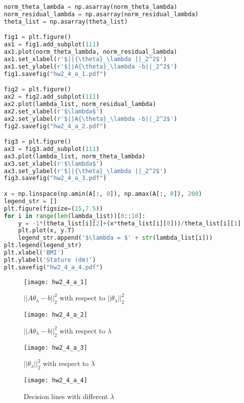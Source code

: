 \documentclass[11pt]{article}
\begin{document}
\begin{enumerate}[label=(\alph*)]
\begin{enumerate}[label=(\roman*)]
\begin{lstlisting}[language=Python, showstringspaces=false]
norm_theta_lambda = np.asarray(norm_theta_lambda)
norm_residual_lambda = np.asarray(norm_residual_lambda)
theta_list = np.asarray(theta_list)

fig1 = plt.figure()
ax1 = fig1.add_subplot(111)
ax1.plot(norm_theta_lambda, norm_residual_lambda)
ax1.set_xlabel(r'$||{\theta}_\lambda ||_2^2$')
ax1.set_ylabel(r'$||A{\theta}_\lambda -b||_2^2$')
fig1.savefig("hw2_4_a_1.pdf")

fig2 = plt.figure()
ax2 = fig2.add_subplot(111)
ax2.plot(lambda_list, norm_residual_lambda)
ax2.set_xlabel(r'$\lambda$')
ax2.set_ylabel(r'$||A{\theta}_\lambda -b||_2^2$')
fig2.savefig("hw2_4_a_2.pdf")

fig3 = plt.figure()
ax3 = fig3.add_subplot(111)
ax3.plot(lambda_list, norm_theta_lambda)
ax3.set_xlabel(r'$\lambda$')
ax3.set_ylabel(r'$||{\theta}_\lambda ||_2^2$')
fig3.savefig("hw2_4_a_3.pdf")

x = np.linspace(np.amin(A[:, 0]), np.amax(A[:, 0]), 200)
legend_str = []
plt.figure(figsize=(15,7.5))
for i in range(len(lambda_list))[0::10]:
    y = -1*(theta_list[i][2]+(x*theta_list[i][0]))/theta_list[i][1]  
    plt.plot(x, y.T)
    legend_str.append('$\lambda = $' + str(lambda_list[i]))
plt.legend(legend_str)
plt.xlabel('BMI')
plt.ylabel('Stature (dm)')
plt.savefig("hw2_4_a_4.pdf")
\end{lstlisting}

\begin{figure}[H]
\centering
\texttt{[image: hw2\_4\_a\_1]}
\caption{$||A{\theta}_\lambda -b||_2^2$ with respect to $||{\theta}_\lambda ||_2^2$}
\label{fig: hw2_4_a_1}
\end{figure}

\begin{figure}[H]
\centering
\texttt{[image: hw2\_4\_a\_2]}
\caption{$||A{\theta}_\lambda -b||_2^2$ with respect to $\lambda$}
\label{fig: hw2_4_a_2}
\end{figure}

\begin{figure}[H]
\centering
\texttt{[image: hw2\_4\_a\_3]}
\caption{$||{\theta}_\lambda ||_2^2$ with respect to $\lambda$}
\label{fig: hw2_4_a_3}
\end{figure}

\begin{figure}[H]
\centering
\texttt{[image: hw2\_4\_a\_4]}
\caption{Decision lines with different $\lambda$}
\label{fig: hw2_4_a_4}
\end{figure}


\end{enumerate}
\end{enumerate}
\end{document}

